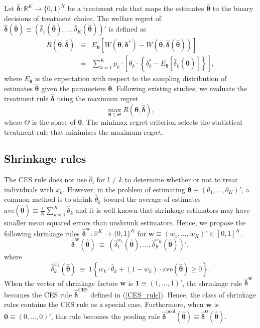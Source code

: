 \documentclass[12pt,a4paper]{article}
\begin{document}
Let $\hat{\bm{\delta}} : \mathbb{R}^K \to \{0,1\}^K$ be a treatment rule that maps the estimates $\hat{\bm{\theta}}$ to the binary decisions of treatment choice. The welfare regret of $\hat{\bm{\delta}}(\hat{\bm{\theta}}) \equiv \left( \hat{\delta}_1(\hat{\bm{\theta}}), \ldots, \hat{\delta}_K(\hat{\bm{\theta}}) \right)'$ is defined as
\begin{eqnarray}
R(\bm{\theta},\hat{\bm{\delta}}) & \equiv & E_{\bm{\theta}} \left[ W(\bm{\theta}, \bm{\delta}^*) - W(\bm{\theta}, \hat{\bm{\delta}}(\hat{\bm{\theta}})) \right] \nonumber \\
&=& \sum_{k=1}^K p_k \cdot \left[ \theta_k \cdot \left\{ \delta_k^* - E_{\bm{\theta}}[\hat{\delta}_k(\hat{\bm{\theta}})] \right\} \right], \label{regret}
\end{eqnarray}
where $E_{\bm{\theta}}$ is the expectation with respect to the sampling distribution of estimates $\hat{\bm{\theta}}$ given the parameters $\bm{\theta}$. Following existing studies, we evaluate the treatment rule $\hat{\bm{\delta}}$ using the maximum regret
\[
\max_{\bm{\theta} \in \Theta} R(\bm{\theta},\hat{\bm{\delta}}),
\]
where $\Theta$ is the space of $\bm{\theta}$. The minimax regret criterion selects the statistical treatment rule that minimizes the maximum regret.

\subsection{Shrinkage rules}\label{SubSec:shrink}
The CES rule does not use $\hat{\theta}_l$ for $l \neq k$ to determine whether or not to treat individuals with $x_k$. However, in the problem of estimating $\bm{\theta} \equiv ( \theta_1, \ldots, \theta_K)'$, a common method is to shrink $\hat{\theta}_k$ toward the average of estimates $\mathrm{ave}(\hat{\bm{\theta}}) \equiv \frac{1}{K} \sum_{k=1}^K \hat{\theta}_k$ and it is well known that shrinkage estimators may have smaller mean squared errors than unshrunk estimators. Hence, we propose the following shrinkage rules $\hat{\bm{\delta}}^{\bm{w}} : \mathbb{R}^K \to \{0,1\}^K$ for $\bm{w} \equiv (w_1, \ldots, w_K)' \in [0,1]^K$.
\begin{equation}
\hat{\bm{\delta}}^{\bm{w}}(\hat{\bm{\theta}}) \ \equiv \ \left( \hat{\delta}_{1}^{w_1}(\hat{\bm{\theta}}), \ldots, \hat{\delta}_{K}^{w_K}(\hat{\bm{\theta}})  \right)', \label{shrinkage_rule}
\end{equation}
where
\begin{equation}
\hat{\delta}_{k}^{w_k}(\hat{\bm{\theta}}) \ \equiv \ 1 \left\{ w_k \cdot \hat{\theta}_k + (1-w_k) \cdot \mathrm{ave}(\hat{\bm{\theta}}) \geq 0 \right\}. \nonumber
\end{equation}
When the vector of shrinkage factors $\bm{w}$ is $\bm{1} \equiv (1,\ldots,1)'$, the shrinkage rule $\hat{\bm{\delta}}^{\bm{w}}$ becomes the CES rule $\hat{\bm{\delta}}^{\text{CES}}$ defined in (\ref{CES_rule}). Hence, the class of shrinkage rules contains the CES rule as a special case. Furthermore, when $\bm{w}$ is $\bm{0} \equiv (0,\ldots,0)'$, this rule becomes the pooling rule $\hat{\bm{\delta}}^{\text{pool}}(\hat{\bm{\theta}}) \equiv \hat{\bm{\delta}}^{\bm{0}}(\hat{\bm{\theta}})$.
\end{document}
